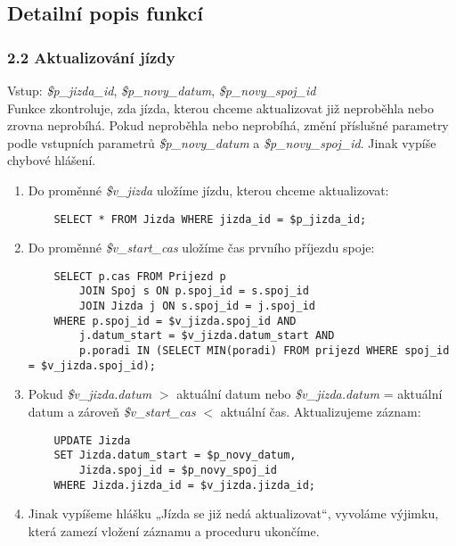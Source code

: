 \documentclass[11pt]{article}
\begin{document}
\subsection{Detailní popis funkcí}


\subsubsection*{2.2 Aktualizování jízdy}
Vstup: \textit{\$p\_jizda\_id}, \textit{\$p\_novy\_datum}, \textit{\$p\_novy\_spoj\_id}\\
Funkce zkontroluje, zda jízda, kterou chceme aktualizovat již neproběhla nebo zrovna neprobíhá. Pokud neproběhla nebo neprobíhá, změní příslušné parametry podle vstupních parametrů \textit{\$p\_novy\_datum} a \textit{\$p\_novy\_spoj\_id}. Jinak vypíše chybové hlášení.

\begin{enumerate}
    \item Do proměnné \textit{\$v\_jizda} uložíme jízdu, kterou chceme aktualizovat:
    \begin{lstlisting}
    SELECT * FROM Jizda WHERE jizda_id = $p_jizda_id;
    \end{lstlisting}

    \item Do proměnné \textit{\$v\_start\_cas} uložíme čas prvního příjezdu spoje:
    \begin{lstlisting}
    SELECT p.cas FROM Prijezd p
        JOIN Spoj s ON p.spoj_id = s.spoj_id
        JOIN Jizda j ON s.spoj_id = j.spoj_id
    WHERE p.spoj_id = $v_jizda.spoj_id AND
        j.datum_start = $v_jizda.datum_start AND
        p.poradi IN (SELECT MIN(poradi) FROM prijezd WHERE spoj_id = $v_jizda.spoj_id);
    \end{lstlisting}
    
    \item Pokud \textit{\$v\_jizda.datum} $>$ aktuální datum nebo \textit{\$v\_jizda.datum} = aktuální datum a zároveň \textit{\$v\_start\_cas} $<$ aktuální čas. Aktualizujeme záznam:
    \begin{lstlisting}
    UPDATE Jizda
    SET Jizda.datum_start = $p_novy_datum,
        Jizda.spoj_id = $p_novy_spoj_id
    WHERE Jizda.jizda_id = $v_jizda.jizda_id;
    \end{lstlisting}

    \item Jinak vypíšeme hlášku „Jízda se již nedá aktualizovat“, vyvoláme výjimku, která zamezí vložení záznamu a proceduru ukončíme.
\end{enumerate}
\end{document}
